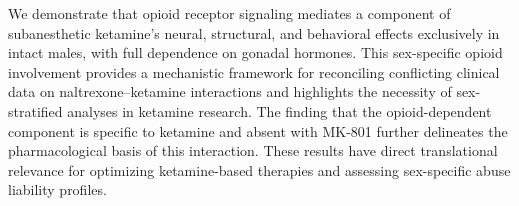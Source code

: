 \documentclass[11pt]{article}
\begin{document}
We demonstrate that opioid receptor signaling mediates a component of subanesthetic ketamine's neural, structural, and behavioral effects exclusively in intact males, with full dependence on gonadal hormones. This sex-specific opioid involvement provides a mechanistic framework for reconciling conflicting clinical data on naltrexone--ketamine interactions and highlights the necessity of sex-stratified analyses in ketamine research. The finding that the opioid-dependent component is specific to ketamine and absent with MK-801 further delineates the pharmacological basis of this interaction. These results have direct translational relevance for optimizing ketamine-based therapies and assessing sex-specific abuse liability profiles.



\end{document}
